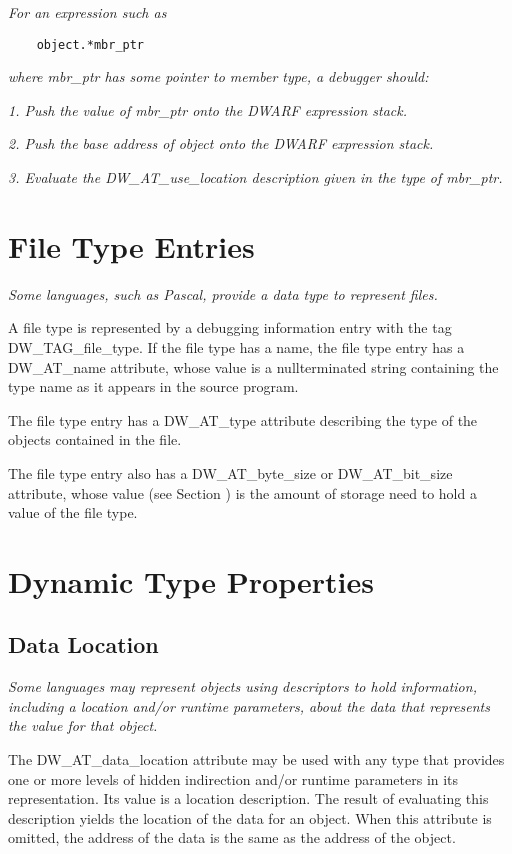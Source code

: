 \textit{For an expression such as}

\begin{lstlisting}
    object.*mbr_ptr
\end{lstlisting}

\textit{where mbr\_ptr has some pointer to member type, a debugger should:}

\textit{1. Push the value of mbr\_ptr onto the DWARF expression stack.}

\textit{2. Push the base address of object onto the DWARF expression stack.}

\textit{3. Evaluate the DW\_AT\_use\_location description 
given in the type of mbr\_ptr.}

\section{File Type Entries}
\label{chap:filetypeentries}

\textit{Some languages, such as Pascal, provide a data type to represent 
files.}

A file type is represented by a debugging information entry
with the tag DW\_TAG\_file\_type. If the file type has a name,
the file type entry has a DW\_AT\_name attribute, whose value
is a null\dash terminated string containing the type name as it
appears in the source program.

The file type entry has a DW\_AT\_type attribute describing
the type of the objects contained in the file.

The file type entry also has a DW\_AT\_byte\_size or
DW\_AT\_bit\_size attribute, whose value 
(see Section )
is the amount of storage need to hold a value of the file type.

\section{Dynamic Type Properties}
\label{chap:dynamictypeproperties}
\subsection{Data Location}
\label{chap:datalocation}

\textit{Some languages may represent objects using descriptors to hold
information, including a location and/or run\dash time parameters,
about the data that represents the value for that object.}

The DW\_AT\_data\_location attribute may be used with any
type that provides one or more levels of hidden indirection
and/or run\dash time parameters in its representation. Its value
is a location description. The result of evaluating this
description yields the location of the data for an object.
When this attribute is omitted, the address of the data is
the same as the address of the object.

